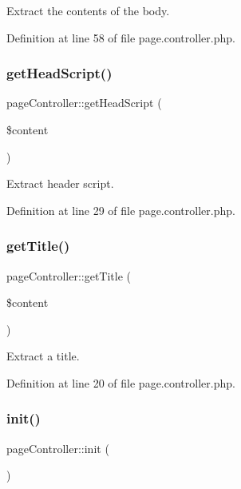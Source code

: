Extract the contents of the body. 



Definition at line 58 of file page.\+controller.\+php.

\hypertarget{classpageController_a7fc1046874a92835813b27613857890c}{}\label{classpageController_a7fc1046874a92835813b27613857890c} 
\subsubsection{\texorpdfstring{get\+Head\+Script()}{getHeadScript()}}
{\footnotesize\ttfamily page\+Controller\+::get\+Head\+Script (\begin{DoxyParamCaption}\item[{}]{\$content }\end{DoxyParamCaption})}



Extract header script. 



Definition at line 29 of file page.\+controller.\+php.

\hypertarget{classpageController_ab5c9e55fad71e3a0c961b3d84d660f3c}{}\label{classpageController_ab5c9e55fad71e3a0c961b3d84d660f3c} 
\subsubsection{\texorpdfstring{get\+Title()}{getTitle()}}
{\footnotesize\ttfamily page\+Controller\+::get\+Title (\begin{DoxyParamCaption}\item[{}]{\$content }\end{DoxyParamCaption})}



Extract a title. 



Definition at line 20 of file page.\+controller.\+php.

\hypertarget{classpageController_ace5123ac45ab7dc1c9c39f3e1901e0a0}{}\label{classpageController_ace5123ac45ab7dc1c9c39f3e1901e0a0} 
\subsubsection{\texorpdfstring{init()}{init()}}
{\footnotesize\ttfamily page\+Controller\+::init (\begin{DoxyParamCaption}{ }\end{DoxyParamCaption})}



